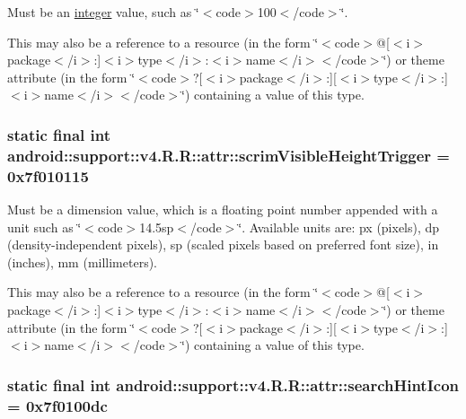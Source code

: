 Must be an \hyperlink{classandroid_1_1support_1_1v4_1_1_r_1_1integer}{integer} value, such as \char`\"{}$<$code$>$100$<$/code$>$\char`\"{}. 

This may also be a reference to a resource (in the form \char`\"{}$<$code$>$@\mbox{[}$<$i$>$package$<$/i$>$:\mbox{]}$<$i$>$type$<$/i$>$:$<$i$>$name$<$/i$>$$<$/code$>$\char`\"{}) or theme attribute (in the form \char`\"{}$<$code$>$?\mbox{[}$<$i$>$package$<$/i$>$:\mbox{]}\mbox{[}$<$i$>$type$<$/i$>$:\mbox{]}$<$i$>$name$<$/i$>$$<$/code$>$\char`\"{}) containing a value of this type. \hypertarget{classandroid_1_1support_1_1v4_1_1_r_1_1attr_afbc18e7ea9cd203965364d9a55850a0}{
\subsubsection[{scrimVisibleHeightTrigger}]{\setlength{\rightskip}{0pt plus 5cm}static final int android::support::v4.R.R::attr::scrimVisibleHeightTrigger = 0x7f010115}}
\label{classandroid_1_1support_1_1v4_1_1_r_1_1attr_afbc18e7ea9cd203965364d9a55850a0}


Must be a dimension value, which is a floating point number appended with a unit such as \char`\"{}$<$code$>$14.5sp$<$/code$>$\char`\"{}. Available units are: px (pixels), dp (density-independent pixels), sp (scaled pixels based on preferred font size), in (inches), mm (millimeters). 

This may also be a reference to a resource (in the form \char`\"{}$<$code$>$@\mbox{[}$<$i$>$package$<$/i$>$:\mbox{]}$<$i$>$type$<$/i$>$:$<$i$>$name$<$/i$>$$<$/code$>$\char`\"{}) or theme attribute (in the form \char`\"{}$<$code$>$?\mbox{[}$<$i$>$package$<$/i$>$:\mbox{]}\mbox{[}$<$i$>$type$<$/i$>$:\mbox{]}$<$i$>$name$<$/i$>$$<$/code$>$\char`\"{}) containing a value of this type. \hypertarget{classandroid_1_1support_1_1v4_1_1_r_1_1attr_8a0504d158cd41b1a5813b84b133e7d4}{
\subsubsection[{searchHintIcon}]{\setlength{\rightskip}{0pt plus 5cm}static final int android::support::v4.R.R::attr::searchHintIcon = 0x7f0100dc}}
\label{classandroid_1_1support_1_1v4_1_1_r_1_1attr_8a0504d158cd41b1a5813b84b133e7d4}


